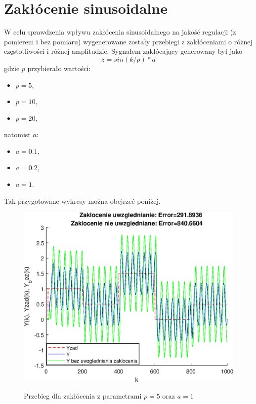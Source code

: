 \chapter{Zakłócenie sinusoidalne}
W celu sprawdzenia wpływu zakłócenia sinusoidalnego na jakość regulacji (z pomierem i bez pomiaru) wygenerowane zostały przebiegi z zakłóceniami o różnej częstotliwości i różnej amplitudzie. Sygnałem zakłócający generowany był jako
\begin{equation}
	z = sin(k/p)*a
	\label{eq:zaksin}
\end{equation}
gdzie $p$ przybierało wartości:
\begin{itemize}
	\item $p=5$,
	\item $p=10$,
	\item $p=20$,
\end{itemize}
natomist $a$:
\begin{itemize}
	\item $a=0.1$,
	\item $a=0.2$,
	\item $a=1$.
\end{itemize}
Tak przygotowane wykresy można obejrzeć poniżej.
\begin{figure}[h!]
	\centering
	\includegraphics[scale=1]{Rys/sin5_1}
	\label{fig:sin5_1}
	\caption{Przebieg dla zakłócenia z parametrami $p=5$ oraz $a=1$}
\end{figure}
